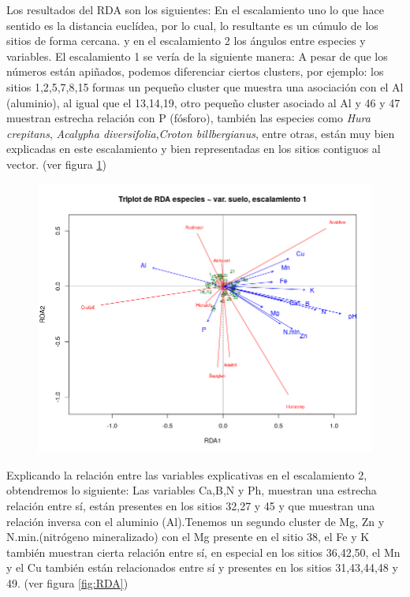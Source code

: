 \documentclass[11pt,]{article}
\begin{document}
Los resultados del RDA son los siguientes: En el escalamiento uno lo que
hace sentido es la distancia euclídea, por lo cual, lo resultante es un
cúmulo de los sitios de forma cercana. y en el escalamiento 2 los
ángulos entre especies y variables. El escalamiento 1 se vería de la
siguiente manera: A pesar de que los números están apiñados, podemos
diferenciar ciertos clusters, por ejemplo: los sitios 1,2,5,7,8,15
formas un pequeño cluster que muestra una asociación con el Al
(aluminio), al igual que el 13,14,19, otro pequeño cluster asociado al
Al y 46 y 47 muestran estrecha relación con P (fósforo), también las
especies como \emph{Hura crepitans}, \emph{Acalypha
diversifolia},\emph{Croton billbergianus}, entre otras, están muy bien
explicadas en este escalamiento y bien representadas en los sitios
contiguos al vector. (ver figura \ref{fig:RDA1_euclidea})

\begin{figure}
\centering
\includegraphics{RDA1_euclidea.png}
\caption{\label{fig:RDA1_euclidea}}
\end{figure}

Explicando la relación entre las variables explicativas en el
escalamiento 2, obtendremos lo siguiente: Las variables Ca,B,N y Ph,
muestran una estrecha relación entre sí, están presentes en los sitios
32,27 y 45 y que muestran una relación inversa con el aluminio
(Al).Tenemos un segundo cluster de Mg, Zn y N.min.(nitrógeno
mineralizado) con el Mg presente en el sitio 38, el Fe y K también
muestran cierta relación entre sí, en especial en los sitios 36,42,50,
el Mn y el Cu también están relacionados entre sí y presentes en los
sitios 31,43,44,48 y 49. (ver figura \ref{fig:RDA})
\end{document}
